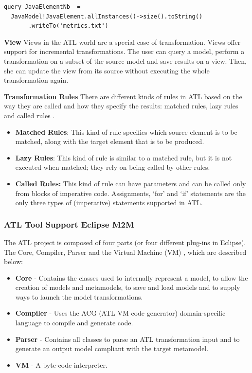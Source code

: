\vspace{\baselineskip}
\begin{lstlisting}[style=umplePlain]
query JavaElementNb  =
  JavaModel!JavaElement.allInstances()->size().toString()
       .writeTo('metrics.txt')
\end{lstlisting}


\textbf{View}
Views in the ATL world are a special case of transformation. Views offer support for incremental transformations. The user can query a model, perform a transformation on a subset of the source model and save results on a view. Then, she can update the view from its source without executing the whole transformation again. 

\textbf{Transformation Rules}
There are different kinds of rules in ATL based on the way they are called and how they specify the results: matched rules, lazy rules and called rules \cite{stephan2009comparative}.

\begin{itemize}
\item \textbf{Matched Rules}: 	This kind of rule specifies which source element is to be matched, along with the target element that is to be produced.

\item \textbf{Lazy Rules}: This kind of rule is similar to a matched rule, but it is not executed when matched; they rely on being called by other rules.

\item \textbf{Called Rules:}	This kind of rule can have parameters and can be called only from blocks of imperative code. Assignments, `for' and `if' statements are the only three types of (imperative) statements supported in ATL.

\end{itemize}

\subsubsection{ATL Tool Support \textemdash Eclipse M2M}

The ATL project is composed of four parts (or four different plug-ins in Eclipse). The Core, Compiler, Parser and the Virtual Machine (VM) \cite{atl}, which are described below:

\begin{itemize}
\item \textbf{Core} - Contains the classes used to internally represent a model, to allow the creation of models and metamodels, to save and load models and to supply ways to launch the model transformations. 
\item \textbf{Compiler} - Uses the ACG (ATL VM code generator) domain-specific language to compile and generate code. 
\item \textbf{Parser} - Contains all classes to parse an ATL transformation input and to generate an output model compliant with the target metamodel.
\item \textbf{VM} - A byte-code interpreter.
\end{itemize}

